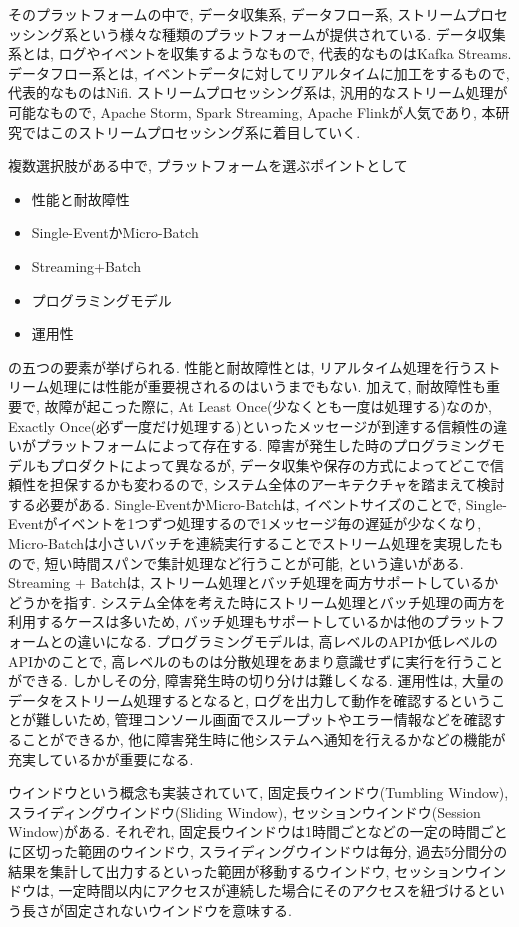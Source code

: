\documentclass[11pt]{jreport}
\begin{document}
そのプラットフォームの中で, データ収集系, データフロー系, ストリームプロセッシング系という様々な種類のプラットフォームが提供されている. 
データ収集系とは, ログやイベントを収集するようなもので, 代表的なものはKafka Streams.
データフロー系とは, イベントデータに対してリアルタイムに加工をするもので, 代表的なものはNifi.
ストリームプロセッシング系は, 汎用的なストリーム処理が可能なもので, Apache Storm, Spark Streaming, Apache Flinkが人気であり, 本研究ではこのストリームプロセッシング系に着目していく.

複数選択肢がある中で, プラットフォームを選ぶポイントとして
\begin{itemize}
  \item 性能と耐故障性
  \item Single-EventかMicro-Batch
  \item Streaming+Batch
  \item プログラミングモデル
  \item 運用性
  \end{itemize} 
  の五つの要素が挙げられる. 
性能と耐故障性とは,
 リアルタイム処理を行うストリーム処理には性能が重要視されるのはいうまでもない. 
 加えて, 耐故障性も重要で, 故障が起こった際に, At Least Once(少なくとも一度は処理する)なのか, Exactly Once(必ず一度だけ処理する)といったメッセージが到達する信頼性の違いがプラットフォームによって存在する. 
 障害が発生した時のプログラミングモデルもプロダクトによって異なるが, データ収集や保存の方式によってどこで信頼性を担保するかも変わるので, システム全体のアーキテクチャを踏まえて検討する必要がある. 
Single-EventかMicro-Batchは,
 イベントサイズのことで, Single-Eventがイベントを1つずつ処理するので1メッセージ毎の遅延が少なくなり, Micro-Batchは小さいバッチを連続実行することでストリーム処理を実現したもので, 短い時間スパンで集計処理など行うことが可能, という違いがある. 
Streaming + Batchは,
 ストリーム処理とバッチ処理を両方サポートしているかどうかを指す. システム全体を考えた時にストリーム処理とバッチ処理の両方を利用するケースは多いため, バッチ処理もサポートしているかは他のプラットフォームとの違いになる.
プログラミングモデルは,
 高レベルのAPIか低レベルのAPIかのことで, 高レベルのものは分散処理をあまり意識せずに実行を行うことができる. しかしその分, 障害発生時の切り分けは難しくなる.
運用性は,
 大量のデータをストリーム処理するとなると, ログを出力して動作を確認するということが難しいため, 管理コンソール画面でスループットやエラー情報などを確認することができるか, 他に障害発生時に他システムへ通知を行えるかなどの機能が充実しているかが重要になる.

ウインドウという概念も実装されていて,  固定長ウインドウ(Tumbling Window), スライディングウインドウ(Sliding Window), セッションウインドウ(Session Window)がある. 
それぞれ, 固定長ウインドウは1時間ごとなどの一定の時間ごとに区切った範囲のウインドウ, 
スライディングウインドウは毎分, 過去5分間分の結果を集計して出力するといった範囲が移動するウインドウ, 
セッションウインドウは, 一定時間以内にアクセスが連続した場合にそのアクセスを紐づけるという長さが固定されないウインドウを意味する. 
\end{document}
